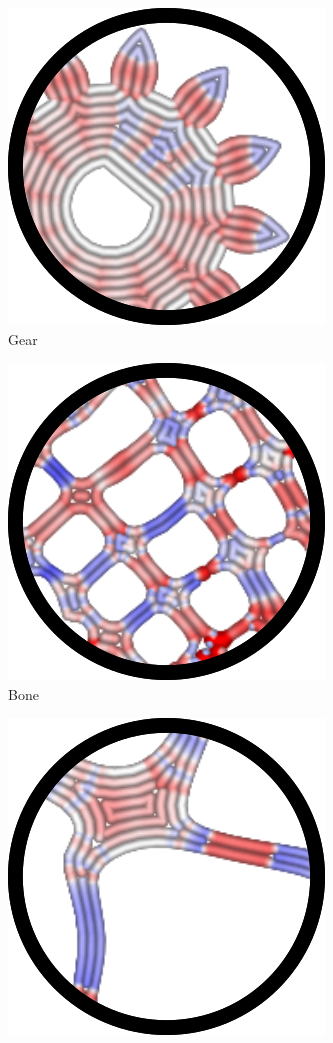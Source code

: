 \begin{figure}
\begin{subfigure}[t]{\figwidth}
{}
\caption{}\label{applications_um}
\end{subfigure}
\begin{subfigure}[t]{\figwidth}\centering
\includegraphics[height=\figheight]{sources-applications-pinion-gear-motor.png}
\caption{Gear}\label{applications_gear}
\end{subfigure}
\begin{subfigure}[t]{\figwidth}\centering
\includegraphics[height=\figheight]{sources-applications-topopt-bone.png}
\caption{Bone}\label{applications_bone}
\end{subfigure}
\begin{subfigure}[t]{\figwidth}\centering
\includegraphics[height=\figheight]{sources-applications-gyroid.png}

\end{subfigure}
\end{figure}

